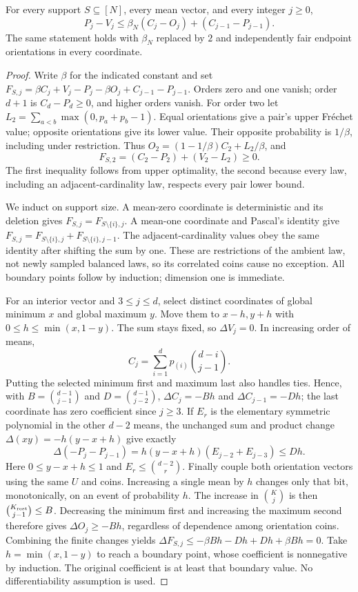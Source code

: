 \begin{lemma}\label{lem:box-coefficient}
For every support $S\subseteq[N]$, every mean vector, and every integer
$j\ge0$,
\begin{equation}\label{eq:box-coefficient}
 P_j-V_j\le\beta_N(C_j-O_j)+(C_{j-1}-P_{j-1}).
\end{equation}
The same statement holds with $\beta_N$ replaced by $2$ and independently
fair endpoint orientations in every coordinate.
\end{lemma}
\begin{proof}
Write $\beta$ for the indicated constant and set
$F_{S,j}=\beta C_j+V_j-P_j-\beta O_j+C_{j-1}-P_{j-1}$.
Orders zero and one vanish; order $d+1$ is $C_d-P_d\ge0$, and higher
orders vanish. For order two let
$L_2=\sum_{a<b}\max(0,p_a+p_b-1)$. Equal orientations give a pair's
upper Fr\'echet value; opposite orientations give its lower value.
Their opposite probability is $1/\beta$, including under restriction.
Thus $O_2=(1-1/\beta)C_2+L_2/\beta$, and
\[
 F_{S,2}=(C_2-P_2)+(V_2-L_2)\ge0.
\]
The first inequality follows from upper optimality, the second because
every law, including an adjacent-cardinality law, respects every pair
lower bound.

We induct on support size. A mean-zero coordinate is deterministic and
its deletion gives $F_{S,j}=F_{S\setminus\{i\},j}$.
A mean-one coordinate and Pascal's identity give
$F_{S,j}=F_{S\setminus\{i\},j}+F_{S\setminus\{i\},j-1}$.
The adjacent-cardinality values obey the same identity after shifting
the sum by one. These are restrictions of the ambient law, not newly
sampled balanced laws, so its correlated coins cause no exception.
All boundary points follow by induction; dimension one is immediate.

For an interior vector and $3\le j\le d$, select distinct coordinates
of global minimum $x$ and global maximum $y$. Move them to $x-h,y+h$
with $0\le h\le\min(x,1-y)$. The sum stays fixed, so $\Delta V_j=0$.
In increasing order of means,
\[
 C_j=\sum_{i=1}^d p_{(i)}\binom{d-i}{j-1}.
\]
Putting the selected minimum first and maximum last also handles ties.
Hence, with $B=\binom{d-1}{j-1}$ and $D=\binom{d-1}{j-2}$,
$\Delta C_j=-Bh$ and $\Delta C_{j-1}=-Dh$; the last coordinate has
zero coefficient since $j\ge3$. If $E_r$ is the elementary symmetric
polynomial in the other $d-2$ means, the unchanged sum and product
change $\Delta(xy)=-h(y-x+h)$ give exactly
\[
 \Delta(-P_j-P_{j-1})
 =h(y-x+h)(E_{j-2}+E_{j-3})\le Dh.
\]
Here $0\le y-x+h\le1$ and $E_r\le\binom{d-2}{r}$.
Finally couple both orientation vectors using the same $U$ and coins.
Increasing a single mean by $h$ changes only that bit, monotonically,
on an event of probability $h$. The increase in $\binom Kj$ is then
$\binom{K_{\rm rest}}{j-1}\le B$. Decreasing the minimum first and
increasing the maximum second therefore gives $\Delta O_j\ge-Bh$,
regardless of dependence among orientation coins. Combining the finite
changes yields $\Delta F_{S,j}\le-\beta Bh-Dh+Dh+\beta Bh=0$.
Take $h=\min(x,1-y)$ to reach a boundary point, whose coefficient is
nonnegative by induction. The original coefficient is at least that
boundary value. No differentiability assumption is used.
\end{proof}

